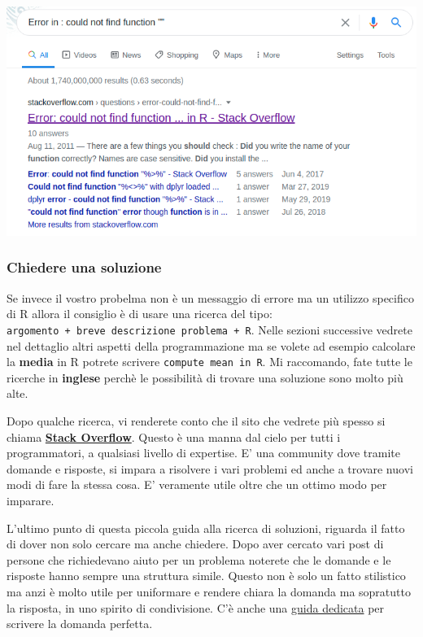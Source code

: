 \documentclass[
]{book}
\begin{document}
\includegraphics{images/stack_question.png}

\hypertarget{chiedere-una-soluzione}{%
\subsubsection*{Chiedere una soluzione}\label{chiedere-una-soluzione}}

Se invece il vostro probelma non è un messaggio di errore ma un utilizzo specifico di R allora il consiglio è di usare una ricerca del tipo: \texttt{argomento\ +\ breve\ descrizione\ problema\ +\ R}. Nelle sezioni successive vedrete nel dettaglio altri aspetti della programmazione ma se volete ad esempio calcolare la \textbf{media} in R potrete scrivere \texttt{compute\ mean\ in\ R}.
Mi raccomando, fate tutte le ricerche in \textbf{inglese} perchè le possibilità di trovare una soluzione sono molto più alte.

Dopo qualche ricerca, vi renderete conto che il sito che vedrete più spesso si chiama \href{https://stackoverflow.com/}{\textbf{Stack Overflow}}. Questo è una manna dal cielo per tutti i programmatori, a qualsiasi livello di expertise. E' una community dove tramite domande e risposte, si impara a risolvere i vari problemi ed anche a trovare nuovi modi di fare la stessa cosa. E' veramente utile oltre che un ottimo modo per imparare.

L'ultimo punto di questa piccola guida alla ricerca di soluzioni, riguarda il fatto di dover non solo cercare ma anche chiedere. Dopo aver cercato vari post di persone che richiedevano aiuto per un problema noterete che le domande e le risposte hanno sempre una struttura simile. Questo non è solo un fatto stilistico ma anzi è molto utile per uniformare e rendere chiara la domanda ma sopratutto la risposta, in uno spirito di condivisione. C'è anche una \href{https://stackoverflow.com/help/how-to-ask}{guida dedicata} per scrivere la domanda perfetta.
\end{document}
